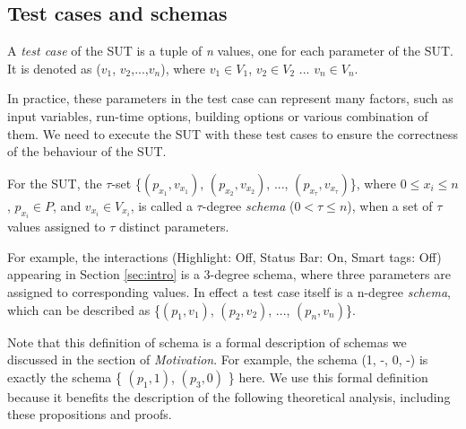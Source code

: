 \newtheorem{assumption}{Assumption}

\subsection{Test cases and schemas}\label{sec:back:testandschema}
\begin{definition}\label{de:testcase}
A \emph{test case} of the SUT is a tuple of \emph{n} values, one for each parameter of the SUT. It is denoted as  ($v_{1}$, $v_{2}$,...,$v_{n}$), where $v_{1}\in V_{1}$, $v_{2} \in V_{2}$ ... $v_{n} \in V_{n}$.
\end{definition}

In practice, these parameters in the test case can represent many factors, such as input variables, run-time options, building options or various combination of them. We need to execute the SUT with these test cases to ensure the correctness of the behaviour of the SUT.




\begin{definition}\label{de:schema}
For the SUT, the $\tau$-set \{$(p_{x_{1}}, v_{x_{1}})$, $(p_{x_{2}}, v_{x_{2}})$, ..., $(p_{x_{\tau}}, v_{x_{\tau}})$\}, where $0 \leq x_{i} \leq n$, $p_{x_{i}} \in P$, and $v_{x_{i}} \in V_{x_{i}}$, is called a $\tau$-degree \emph{schema} ($0 < \tau \leq n $), when a set of $\tau$ values assigned to $\tau$ distinct parameters.
\end{definition}

For example, the interactions (Highlight: Off, Status Bar: On, Smart tags: Off) appearing in Section \ref{sec:intro} is a 3-degree schema, where three parameters are assigned to corresponding values. In effect a test case itself is a n-degree \emph{schema}, which can be described as \{$(p_{1}, v_{1})$, $(p_{2}, v_{2})$, ..., $(p_{n}, v_{n})$\}.

Note that this definition of schema is a formal description of schemas we discussed in the section of \emph{Motivation}. For example, the schema (1, -, 0, -) is exactly the schema \{ $(p_{1}, 1)$, $(p_{3}, 0)$ \} here. We use this formal definition because it benefits the description of the following theoretical analysis, including these propositions and proofs.

